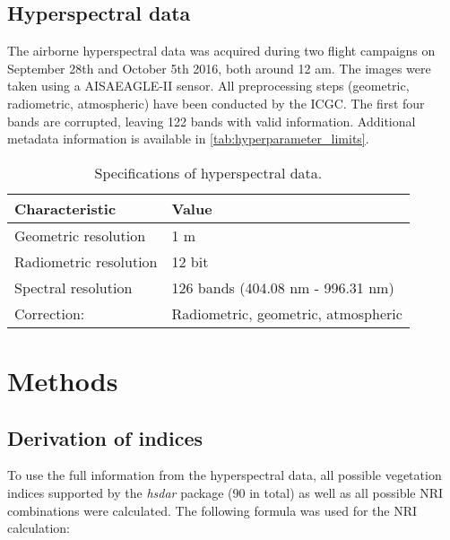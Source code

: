 \documentclass[review]{elsarticle}
\begin{document}


\subsection{Hyperspectral data}

\noindent The airborne hyperspectral data was acquired during two flight campaigns on September 28th and October 5th 2016, both around 12 am.
The images were taken using a AISAEAGLE-II sensor.
All preprocessing steps (geometric, radiometric, atmospheric) have been conducted by the \ac{ICGC}.
The first four bands are corrupted, leaving 122 bands with valid information.
Additional metadata information is available in \autoref{tab:hyperparameter_limits}.

\begin{table}[b!]
\centering
\caption[t]{Specifications of hyperspectral data.}
\begingroup\footnotesize
\begin{tabular}{ll}
	\\
	Characteristic         & Value                               \\
	\hline
	Geometric resolution   & 1 m                                 \\
	Radiometric resolution & 12 bit                              \\
	Spectral resolution    & 126 bands (404.08 nm - 996.31 nm)   \\
	Correction:            & Radiometric, geometric, atmospheric
\end{tabular}
\endgroup
\label{tab:hyperparameter_limits}
\end{table}



\section{Methods}

\subsection{Derivation of indices}
\noindent To use the full information from the hyperspectral data, all possible vegetation indices supported by the \textit{hsdar} package (90 in total) as well as all possible \ac{NRI} combinations were calculated.
The following formula was used for the NRI calculation:
\end{document}
